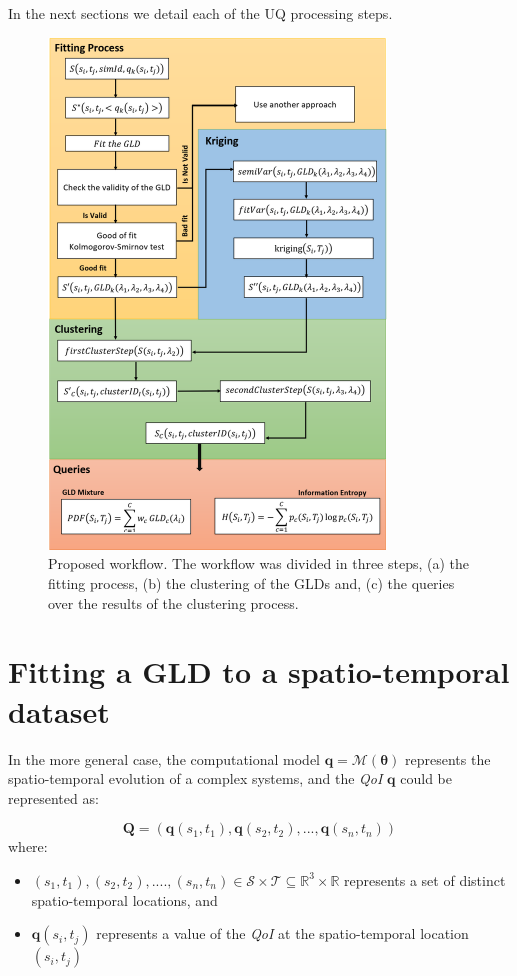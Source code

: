 In the next sections we detail each of the UQ processing steps.

\begin{figure}[H]
    \centering
    \includegraphics[width=0.8\textwidth]{img/Workflow.png}
    \caption{Proposed workflow. The workflow was divided in three steps, (a) the fitting process, (b) the clustering of the GLDs and, (c) the queries over the results of the clustering process.}
    \label{fig:workflow}
\end{figure}

\section{Fitting a GLD to a spatio-temporal dataset}\label{sec:fitting}
In the more general case, the computational model $\bm{q}=\mathcal{M}(\bm{\theta})$ represents the spatio-temporal evolution of a complex systems, and the \textit{QoI} $\bm{q}$ could be represented as:  

\begin{equation} \label{eq:spatio_temporal}
\mathbf{Q} = (\mathbf{q}(s_{1},t_{1}),\mathbf{q}(s_{2},t_{2}),...,\mathbf{q}(s_{n},t_{n}))  
\end{equation}
where:
\begin{itemize}
\item $(s_{1},t_{1}),(s_{2},t_{2}),....,(s_{n},t_{n}) \in \mathcal{S} \times \mathcal{T}\subseteq\mathbb{R}^{3}\times\mathbb{R}$ represents a set of distinct spatio-temporal locations, and
\item $\mathbf{q}(s_{i},t_{j})$ represents a value of the \textit{QoI} at the spatio-temporal location $(s_{i},t_{j})$
\end{itemize}

